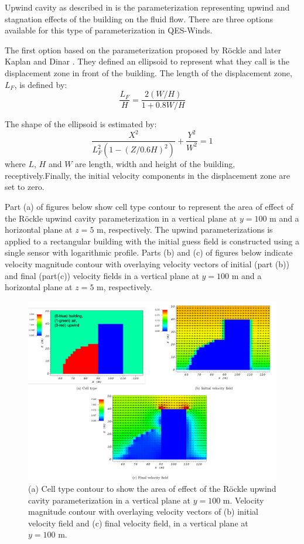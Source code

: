 Upwind cavity as described in \cite{nelson20085,bagal2004improved,gowardhan2010evaluation} is the parameterization representing upwind and stagnation effects of the building on the fluid flow. There are three options available for this type of parameterization in QES-Winds.

The first option based on the parameterization proposed by R\"{o}ckle \cite{rockle1990bestimmung} and later Kaplan and Dinar \cite{kaplan1996lagrangian}. They defined an ellipsoid to represent what they call is the displacement zone in front of the building. The length of the displacement zone, $L_F$, is defined by:
\begin{equation}
\frac{L_F}{H}=\frac{2(W / H)}{1+0.8 W / H}
\label{eq:lf}
\end{equation}

The shape of the ellipsoid is estimated by:
\begin{equation}
\frac{X^{2}}{L_F^{2}\left(1-(Z / 0.6 H)^{2}\right)}+\frac{Y^{2}}{W^{2}}=1
\label{eq:upwind}
\end{equation}
where $L$, $H$ and $W$ are length, width and height of the building, receptively.Finally, the initial velocity components in the displacement zone are set to zero.


Part (a) of figures below show cell type contour to represent the area of effect of the R\"{o}ckle upwind cavity parameterization in a vertical plane at $y=100$ m and a horizontal plane at $z=5$ m, respectively. The upwind parameterizations is applied to a rectangular building with the initial guess field is constructed using a single sensor with logarithmic profile. Parts (b) and (c) of figures below indicate velocity magnitude contour with overlaying velocity vectors of initial (part (b)) and final (part(c)) velocity fields in a vertical plane at $y=100$ m and a horizontal plane at $z=5$ m, respectively.

\begin{figure}[h!]
    \centering
    \includegraphics[width=\textwidth]{Images/upwind_y_100_1.pdf}
    \caption{(a) Cell type contour to show the area of effect of the R\"{o}ckle upwind cavity parameterization in a vertical plane at $y=100$ m. Velocity magnitude contour with overlaying velocity vectors of (b) initial velocity field and (c) final velocity field, in a vertical plane at $y=100$ m.}
\end{figure}

